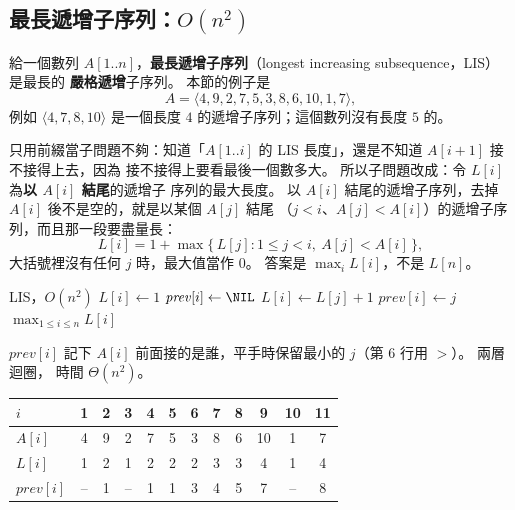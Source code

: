 \subsection{最長遞增子序列：\texorpdfstring{$O(n^2)$}{O(n²)}}
\label{sec:dp-lis}

給一個數列 $A[1..n]$，\textbf{最長遞增子序列}（longest increasing subsequence，LIS）是最長的
\textbf{嚴格遞增}子序列。 本節的例子是
\[
A = \langle 4, 9, 2, 7, 5, 3, 8, 6, 10, 1, 7 \rangle ,
\]
例如 $\langle 4, 7, 8, 10 \rangle$ 是一個長度 $4$ 的遞增子序列；這個數列沒有長度 $5$ 的。

只用前綴當子問題不夠：知道「$A[1..i]$ 的 LIS 長度」，還是不知道 $A[i+1]$ 接不接得上去，因為
接不接得上要看最後一個數多大。 所以子問題改成：令 $L[i]$ 為\textbf{以 $A[i]$ 結尾}的遞增子
序列的最大長度。 以 $A[i]$ 結尾的遞增子序列，去掉 $A[i]$ 後不是空的，就是以某個 $A[j]$ 結尾
（$j < i$、$A[j] < A[i]$）的遞增子序列，而且那一段要盡量長：
\[
L[i] = 1 + \max\bigl\{\, L[j] : 1 \le j < i,\ A[j] < A[i] \,\bigr\},
\]
大括號裡沒有任何 $j$ 時，最大值當作 $0$。 答案是 $\max_i L[i]$，不是 $L[n]$。

\begin{pseudo}[label=alg:dp-lis-quad]{LIS，$O(n^2)$}
        \State $L[i] \gets 1$
        \State $\mathit{prev}[i] \gets \NIL$
                \State $L[i] \gets L[j] + 1$
                \State $\mathit{prev}[i] \gets j$
            \EndIf
        \EndFor
    \EndFor
    \State \Return $\max_{1 \le i \le n} L[i]$
\EndFunction
\end{pseudo}

$\mathit{prev}[i]$ 記下 $A[i]$ 前面接的是誰，平手時保留最小的 $j$（第 6 行用 $>$）。 兩層迴圈，
時間 $\Theta(n^2)$。

\begin{center}
\begin{tabular}{l*{11}{c}}
\toprule
$i$ & 1 & 2 & 3 & 4 & 5 & 6 & 7 & 8 & 9 & 10 & 11 \\
\midrule
$A[i]$ & 4 & 9 & 2 & 7 & 5 & 3 & 8 & 6 & 10 & 1 & 7 \\
$L[i]$ & 1 & 2 & 1 & 2 & 2 & 2 & 3 & 3 & 4 & 1 & 4 \\
$\mathit{prev}[i]$ & -- & 1 & -- & 1 & 1 & 3 & 4 & 5 & 7 & -- & 8 \\
\bottomrule
\end{tabular}
\end{center}

